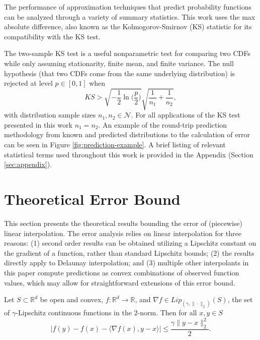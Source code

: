\documentclass[smallextended,final]{svjour3}  %
\begin{document}
The performance of approximation techniques that predict probability
functions can be analyzed through a variety of summary
statistics. This work uses the max absolute difference, also known as
the Kolmogorov-Smirnov (KS) statistic \cite{lilliefors1967kolmogorov}
for its compatibility with the KS test.

The two-sample KS test is a useful nonparametric test for comparing
two CDFs while only assuming stationarity, finite mean, and finite
variance. The null hypothesis (that two CDFs come from the same
underlying distribution) is rejected at level $p \in [0,1]$ when
 $$ KS > \sqrt{-\frac{1}{2}\ln\biggl(\frac{p}{2}\biggr)} \sqrt{\frac{1}{n_1} + \frac{1}{n_2}}, $$
with distribution sample sizes $n_1,n_2 \in \mathcal{N}$. For all
applications of the KS test presented in this work $n_1 = n_2$. An
example of the round-trip prediction methodology from known and
predicted distributions to the calculation of error can be seen in
Figure \ref{fig:prediction-example}. A brief listing of relevant
statistical terms used throughout this work is provided in
the Appendix (Section \ref{sec:appendix}).

\section{Theoretical Error Bound}
\label{sec:theory}

This section presents the theoretical results bounding the error of
(piecewise) linear interpolation. The error analysis relies on linear
interpolation for three reasons: (1) second order results can be
obtained utilizing a Lipschitz constant on the gradient of a function,
rather than standard Lipschitz bounds; (2) the results directly apply
to Delaunay interpolation; and (3) multiple other interpolants in this
paper compute predictions as convex combinations of observed function
values, which may allow for straightforward extensions of this error
bound.

\begin{plainlemma}
  \label{lemma:1}
  Let $S \subset \mathbb{R}^d$ be open and convex, $f: \mathbb{R}^d
  \rightarrow \mathbb{R}$, and $\nabla f \in
  Lip_{(\gamma,\|\cdot\|_2)}(S)$, the set of $\gamma$-Lipschitz
  continuous functions in the $2$-norm. Then for all $x,y \in S$
  $$\big|f(y) - f(x) - \langle \nabla f(x), y - x \rangle \big| \leq \frac{\gamma \|y - x\|_2^2}{2}.$$
\end{plainlemma}
\end{document}
